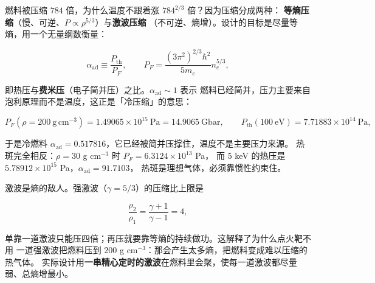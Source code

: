 燃料被压缩 $784$ 倍，为什么温度不跟着涨 $784^{2/3}$ 倍？因为压缩分成两种：
\textbf{等熵压缩}（慢、可逆、$P \propto \rho^{5/3}$）与\textbf{激波压缩}
（不可逆、熵增）。设计的目标是尽量等熵，用一个无量纲数衡量：

\begin{equation}
\alpha_{\mathrm{ad}} \equiv \frac{P_{\mathrm{th}}}{P_F},
\qquad
P_F = \frac{(3\pi^2)^{2/3}\hbar^2}{5 m_e} n_e^{5/3},
\label{eq:app-ai-fermi}
\end{equation}

即热压与\textbf{费米压}（电子简并压）之比。$\alpha_{\mathrm{ad}} \sim 1$ 表示
燃料已经简并，压力主要来自泡利原理而不是温度，这正是「冷压缩」的意思：

\begin{equation}
P_F(\rho = 200\ \mathrm{g\,cm^{-3}}) = 1.49065\times10^{15}\ \mathrm{Pa}
= 14.9065\ \mathrm{Gbar},
\qquad
P_{\mathrm{th}}(100\ \mathrm{eV}) = 7.71883\times10^{14}\ \mathrm{Pa},
\label{eq:app-ai-adiabat}
\end{equation}

于是冷燃料 $\alpha_{\mathrm{ad}} = 0.517816$，它已经被简并压撑住，温度不是主要压力来源。
热斑完全相反：$\rho = 30$ g cm$^{-3}$ 时 $P_F = 6.3124\times10^{13}$ Pa，
而 $5$ keV 的热压是 $5.78912\times10^{15}$ Pa，$\alpha_{\mathrm{ad}} = 91.7103$，
热斑是理想气体，必须靠惯性约束住。

激波是熵的敌人。强激波（$\gamma = 5/3$）的压缩比上限是

\begin{equation}
\frac{\rho_2}{\rho_1} = \frac{\gamma+1}{\gamma-1} = 4,
\label{eq:app-ai-shock}
\end{equation}

单靠一道激波只能压四倍；再压就要靠等熵的持续做功。这解释了为什么点火靶不用
一道强激波把燃料压到 $200$ g cm$^{-3}$：那会产生太多熵，把燃料变成难以压缩的热气体。
实际设计用\textbf{一串精心定时的激波}在燃料里会聚，使每一道激波都尽量弱、总熵增最小。

